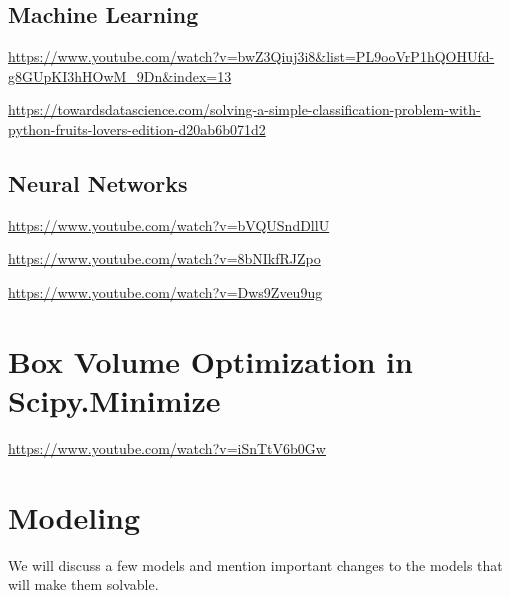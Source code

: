\documentclass[../open-optimization/open-optimization.tex]{subfiles}
\begin{document}
\subsection{Machine Learning}

\url{https://www.youtube.com/watch?v=bwZ3Qiuj3i8&list=PL9ooVrP1hQOHUfd-g8GUpKI3hHOwM_9Dn&index=13}


\url{https://towardsdatascience.com/solving-a-simple-classification-problem-with-python-fruits-lovers-edition-d20ab6b071d2}

\subsection{Neural Networks}


\url{https://www.youtube.com/watch?v=bVQUSndDllU}

\url{https://www.youtube.com/watch?v=8bNIkfRJZpo}

\url{https://www.youtube.com/watch?v=Dws9Zveu9ug}



\section{Box Volume Optimization in Scipy.Minimize}
\url{https://www.youtube.com/watch?v=iSnTtV6b0Gw}

\section{Modeling}
We will discuss a few models and mention important changes to the models that will make them solvable.  
\end{document}
